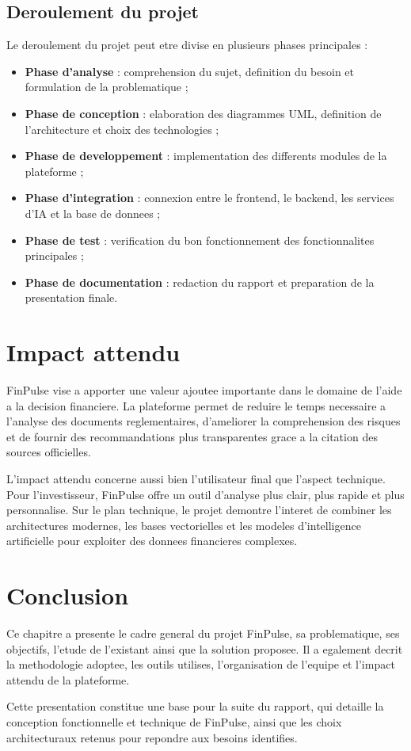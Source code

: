 \subsection{Deroulement du projet}

Le deroulement du projet peut etre divise en plusieurs phases principales :

\begin{itemize}
    \item \textbf{Phase d'analyse} : comprehension du sujet, definition du besoin et
    formulation de la problematique ;
    \item \textbf{Phase de conception} : elaboration des diagrammes UML, definition de
    l'architecture et choix des technologies ;
    \item \textbf{Phase de developpement} : implementation des differents modules de la
    plateforme ;
    \item \textbf{Phase d'integration} : connexion entre le frontend, le backend, les
    services d'IA et la base de donnees ;
    \item \textbf{Phase de test} : verification du bon fonctionnement des
    fonctionnalites principales ;
    \item \textbf{Phase de documentation} : redaction du rapport et preparation de la
    presentation finale.
\end{itemize}

\section{Impact attendu}

FinPulse vise a apporter une valeur ajoutee importante dans le domaine de l'aide a la
decision financiere. La plateforme permet de reduire le temps necessaire a l'analyse
des documents reglementaires, d'ameliorer la comprehension des risques et de fournir
des recommandations plus transparentes grace a la citation des sources officielles.

L'impact attendu concerne aussi bien l'utilisateur final que l'aspect technique. Pour
l'investisseur, FinPulse offre un outil d'analyse plus clair, plus rapide et plus
personnalise. Sur le plan technique, le projet demontre l'interet de combiner les
architectures modernes, les bases vectorielles et les modeles d'intelligence
artificielle pour exploiter des donnees financieres complexes.

\section{Conclusion}

Ce chapitre a presente le cadre general du projet FinPulse, sa problematique, ses
objectifs, l'etude de l'existant ainsi que la solution proposee. Il a egalement decrit
la methodologie adoptee, les outils utilises, l'organisation de l'equipe et l'impact
attendu de la plateforme.

Cette presentation constitue une base pour la suite du rapport, qui detaille la
conception fonctionnelle et technique de FinPulse, ainsi que les choix architecturaux
retenus pour repondre aux besoins identifies.
